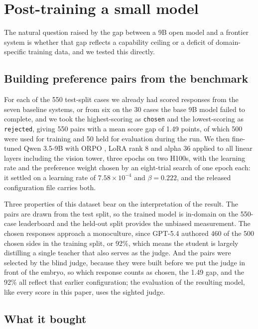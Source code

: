 \documentclass[11pt]{article}
\begin{document}
\section{Post-training a small model}
\label{sec:orpo}


The natural question raised by the gap between a 9B open model and a frontier
system is whether that gap reflects a capability ceiling or a deficit of
domain-specific training data, and we tested this directly.

\subsection{Building preference pairs from the benchmark}

For each of the 550 test-split cases we already had scored responses from the
seven baseline systems, or from six on the 30 cases the base 9B model failed to
complete, and we took the highest-scoring as \texttt{chosen} and the
lowest-scoring as \texttt{rejected}, giving 550 pairs with a mean score gap of 1.49 points, of
which 500 were used for training and 50 held for evaluation during the run. We then fine-tuned Qwen 3.5-9B with ORPO
\citep{hong2024orpo}, LoRA rank 8 and alpha 36 applied to all linear layers
including the vision tower, three epochs on two H100s, with the learning rate and
the preference weight chosen by an eight-trial search of one epoch each: it
settled on a learning rate of $7.58\times10^{-4}$ and $\beta = 0.222$, and the
released configuration file carries both.

Three properties of this dataset bear on the interpretation of the result. The
pairs are drawn from the test split, so the trained model is in-domain on the
550-case leaderboard and the held-out split provides the unbiased measurement. The
chosen responses approach a monoculture, since GPT-5.4 authored 460 of the 500
chosen sides in the training split, or 92\%, which means the student is largely
distilling a single teacher that also serves as the judge. And the pairs were
selected by the blind judge, because they were built before we put the judge in
front of the embryo, so which response counts as chosen, the 1.49 gap, and the
92\% all reflect that earlier configuration; the evaluation of the resulting
model, like every score in this paper, uses the sighted judge.

\subsection{What it bought}
\end{document}
